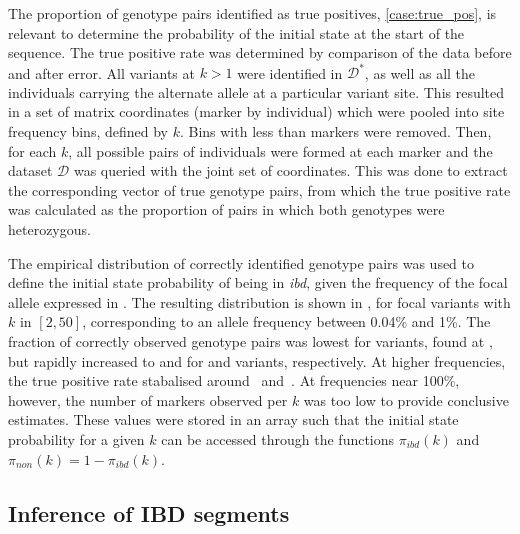 The proportion of genotype pairs identified as true positives, \cref{case:true_pos}, is relevant to determine the probability of the initial state at the start of the sequence.
The true positive rate was determined by comparison of the data before and after error.
All \fk{} variants at ${k > 1}$ were identified in $\mathcal{D}^\ast$, as well as all the individuals carrying the alternate allele at a particular variant site.
This resulted in a set of matrix coordinates (marker by individual) which were pooled into site frequency bins, defined by $k$.
Bins with less than  markers were removed.
Then, for each $k$, all possible pairs of individuals were formed at each marker and the dataset $\mathcal{D}$ was queried with the joint set of coordinates.
This was done to extract the corresponding vector of true genotype pairs, from which the true positive rate was calculated as the proportion of pairs in which both genotypes were heterozygous.

%

%

The empirical distribution of correctly identified genotype pairs was used to define the initial state probability of being in \emph{ibd}, given the frequency of the focal allele expressed in \fk{}.
The resulting distribution is shown in , for focal variants with $k$ in ${[2, 50]}$, corresponding to an allele frequency between 0.04\% and 1\%.
The fraction of correctly observed genotype pairs was lowest for  variants, found at , but rapidly increased to  and  for  and  variants, respectively.
At higher frequencies, the true positive rate stabalised around ~and~.
At frequencies near 100\%, however, the number of markers observed per $k$ was too low to provide conclusive estimates.
These values were stored in an array such that the initial state probability for a given $k$ can be accessed through the functions $\pi_\textit{ibd}(k)$ and ${\pi_\textit{non}(k) = 1 - \pi_\textit{ibd}(k)}$.



%
\subsection{Inference of IBD segments}
%

